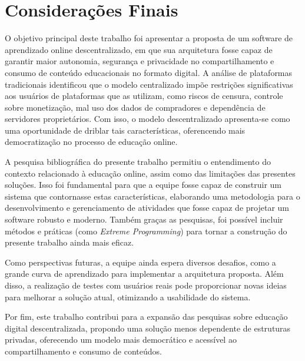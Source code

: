 \chapter[Considerações Finais]{Considerações Finais}
\label{cap:consideracoes}

O objetivo principal deste trabalho foi apresentar a proposta de um software de aprendizado online descentralizado, em que sua arquitetura fosse capaz de garantir maior autonomia, segurança e privacidade no compartilhamento e consumo de conteúdo educacionais no formato digital. A análise de plataformas tradicionais identificou que o modelo centralizado impõe restrições significativas aos usuários de plataformas que as utilizam, como riscos de censura, controle sobre monetização, mal uso dos dados de compradores e dependência de servidores proprietários. Com isso, o modelo descentralizado apresenta-se como uma oportunidade de driblar tais características, oferencendo mais democratização no processo de educação online.

A pesquisa bibliográfica do presente trabalho permitiu o entendimento do contexto relacionado à educação online, assim como das limitações das presentes soluções. Isso foi fundamental para que a equipe fosse capaz de construir um sistema que contornasse estas características, elaborando uma metodologia para o desenvolvimento e gerenciamento de atividades que fosse capaz de projetar um software robusto e moderno. Também graças as pesquisas, foi possível incluir métodos e práticas (como \textit{Extreme Programming}) para tornar a construção do presente trabalho ainda mais eficaz.

Como perspectivas futuras, a equipe ainda espera diversos desafios, como a grande curva de aprendizado para implementar a arquitetura proposta. Além disso, a realização de testes com usuários reais pode proporcionar novas ideias para melhorar a solução atual, otimizando a usabilidade do sistema.

Por fim, este trabalho contribui para a expansão das pesquisas sobre educação digital descentralizada, propondo uma solução menos dependente de estruturas privadas, oferecendo um modelo mais democrático e acessível ao compartilhamento e consumo de conteúdos.

